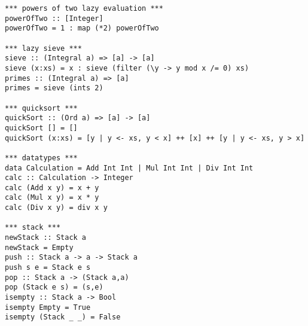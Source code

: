 \documentclass{article}
\begin{document}
\begin{verbatim}
*** powers of two lazy evaluation ***
powerOfTwo :: [Integer]
powerOfTwo = 1 : map (*2) powerOfTwo

*** lazy sieve ***
sieve :: (Integral a) => [a] -> [a]
sieve (x:xs) = x : sieve (filter (\y -> y mod x /= 0) xs)
primes :: (Integral a) => [a]
primes = sieve (ints 2)

*** quicksort ***
quickSort :: (Ord a) => [a] -> [a]
quickSort [] = []
quickSort (x:xs) = [y | y <- xs, y < x] ++ [x] ++ [y | y <- xs, y > x]

*** datatypes ***
data Calculation = Add Int Int | Mul Int Int | Div Int Int
calc :: Calculation -> Integer
calc (Add x y) = x + y
calc (Mul x y) = x * y
calc (Div x y) = div x y

*** stack *** 
newStack :: Stack a
newStack = Empty
push :: Stack a -> a -> Stack a
push s e = Stack e s
pop :: Stack a -> (Stack a,a)
pop (Stack e s) = (s,e)
isempty :: Stack a -> Bool
isempty Empty = True
isempty (Stack _ _) = False
    \end{verbatim}
\end{document}
